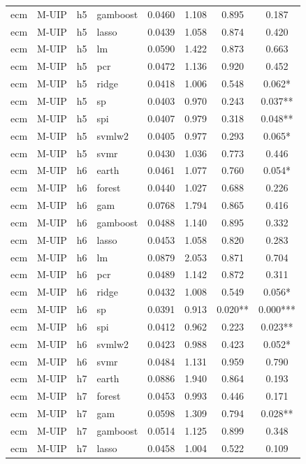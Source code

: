 \begin{ThreePartTable}
\begin{longtable}[t]{llclcccc}
ecm & M-UIP & h5 & gamboost & 0.0460 & 1.108 & 0.895 & 0.187\\
ecm & M-UIP & h5 & lasso & 0.0439 & 1.058 & 0.874 & 0.420\\
ecm & M-UIP & h5 & lm & 0.0590 & 1.422 & 0.873 & 0.663\\
ecm & M-UIP & h5 & pcr & 0.0472 & 1.136 & 0.920 & 0.452\\
ecm & M-UIP & h5 & ridge & 0.0418 & 1.006 & 0.548 & 0.062*\\
ecm & M-UIP & h5 & sp & 0.0403 & 0.970 & 0.243 & 0.037**\\
ecm & M-UIP & h5 & spi & 0.0407 & 0.979 & 0.318 & 0.048**\\
ecm & M-UIP & h5 & svmlw2 & 0.0405 & 0.977 & 0.293 & 0.065*\\
ecm & M-UIP & h5 & svmr & 0.0430 & 1.036 & 0.773 & 0.446\\
\addlinespace
ecm & M-UIP & h6 & earth & 0.0461 & 1.077 & 0.760 & 0.054*\\
ecm & M-UIP & h6 & forest & 0.0440 & 1.027 & 0.688 & 0.226\\
ecm & M-UIP & h6 & gam & 0.0768 & 1.794 & 0.865 & 0.416\\
ecm & M-UIP & h6 & gamboost & 0.0488 & 1.140 & 0.895 & 0.332\\
ecm & M-UIP & h6 & lasso & 0.0453 & 1.058 & 0.820 & 0.283\\
ecm & M-UIP & h6 & lm & 0.0879 & 2.053 & 0.871 & 0.704\\
ecm & M-UIP & h6 & pcr & 0.0489 & 1.142 & 0.872 & 0.311\\
ecm & M-UIP & h6 & ridge & 0.0432 & 1.008 & 0.549 & 0.056*\\
ecm & M-UIP & h6 & sp & 0.0391 & 0.913 & 0.020** & 0.000***\\
ecm & M-UIP & h6 & spi & 0.0412 & 0.962 & 0.223 & 0.023**\\
ecm & M-UIP & h6 & svmlw2 & 0.0423 & 0.988 & 0.423 & 0.052*\\
ecm & M-UIP & h6 & svmr & 0.0484 & 1.131 & 0.959 & 0.790\\
\addlinespace
ecm & M-UIP & h7 & earth & 0.0886 & 1.940 & 0.864 & 0.193\\
ecm & M-UIP & h7 & forest & 0.0453 & 0.993 & 0.446 & 0.171\\
ecm & M-UIP & h7 & gam & 0.0598 & 1.309 & 0.794 & 0.028**\\
ecm & M-UIP & h7 & gamboost & 0.0514 & 1.125 & 0.899 & 0.348\\
ecm & M-UIP & h7 & lasso & 0.0458 & 1.004 & 0.522 & 0.109\\

\end{longtable}
\end{ThreePartTable}
